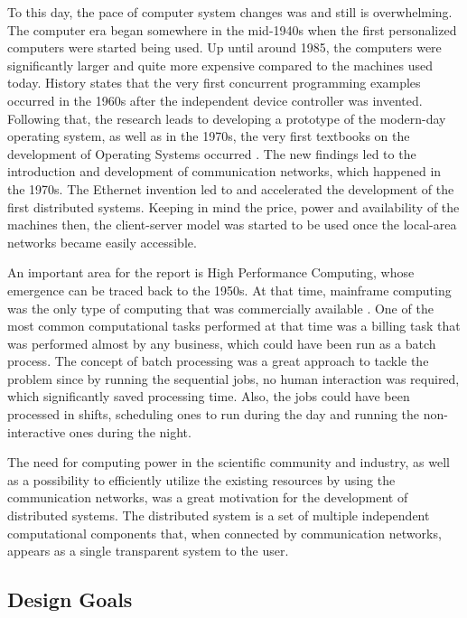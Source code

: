 \documentclass[10pt]{report}
\begin{document}
To this day, the pace of computer system changes was and still is overwhelming. The computer era began somewhere in the mid-1940s when the first personalized computers were started being used. Up until around 1985, the computers were significantly larger and quite more expensive compared to the machines used today. History states that the very first concurrent programming examples occurred in the 1960s after the independent device controller was invented. Following that, the research leads to developing a prototype of the modern-day operating system, as well as in the 1970s, the very first textbooks on the development of Operating Systems occurred \cite{firstOS}. The new findings led to the introduction and development of communication networks, which happened in the 1970s. The Ethernet invention led to and accelerated the development of the first distributed systems. Keeping in mind the price, power and availability of the machines then, the client-server model was started to be used once the local-area networks became easily accessible.
\newline

An important area for the report is High Performance Computing, whose emergence can be traced back to the 1950s. At that time, mainframe computing was the only type of computing that was commercially available \cite{firstHPC}. One of the most common computational tasks performed at that time was a billing task that was performed almost by any business, which could have been run as a batch process. The concept of batch processing was a great approach to tackle the problem since by running the sequential jobs, no human interaction was required, which significantly saved processing time. Also, the jobs could have been processed in shifts, scheduling ones to run during the day and running the non-interactive ones during the night.
\newline

The need for computing power in the scientific community and industry, as well as a possibility to efficiently utilize the existing resources by using the communication networks, was a great motivation for the development of distributed systems. The distributed system is a set of multiple independent computational components that, when connected by communication networks, appears as a single transparent system to the user.

\subsection{Design Goals}
\end{document}
